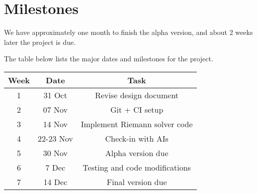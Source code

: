 \section{Milestones}

We have approximately one month to finish the alpha version, and about 2 weeks later the project is due.

The table below lists the major dates and milestones for the project.

\begin{tabular}{c|c|c}
    Week & Date & Task \\
    \hline
    1 & 31 Oct & Revise design document \\
    2 & 07 Nov & Git + CI setup \\
    3 & 14 Nov & Implement Riemann solver code \\
    4 & 22-23 Nov & Check-in with AIs \\
    5 & 30 Nov & Alpha version due \\
    6 & 7 Dec & Testing and code modifications \\
    7 & 14 Dec & Final version due \\
\end{tabular}
